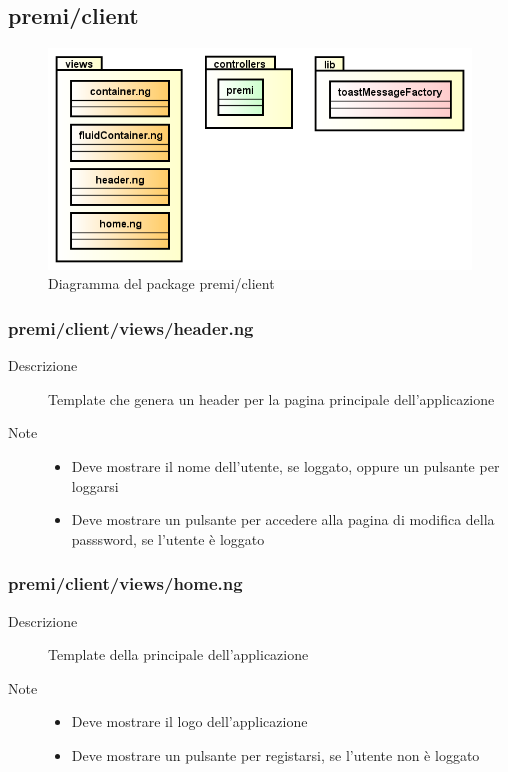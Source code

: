 \clearpage
\subsection{premi/client}
\begin{figure}[h]
\begin{center}
\includegraphics[scale=0.50]{img/diapkg/client.png}
\caption{Diagramma del package premi/client}
\end{center}
\end{figure}


\subsubsection{premi/client/views/header.ng}

\begin{description}
\item[Descrizione] \hfill
	Template che genera un header per la pagina principale dell'applicazione
	\item[Note] \hfill
	\begin{itemize}
			\item Deve mostrare il nome dell'utente, se loggato, oppure un pulsante per loggarsi
			\item Deve mostrare un pulsante per accedere alla pagina di modifica della passsword, se l'utente è loggato
	\end{itemize}
\end{description}

\subsubsection{premi/client/views/home.ng}

\begin{description}
\item[Descrizione] \hfill
	Template della principale dell'applicazione
	\item[Note] \hfill
	\begin{itemize}
			\item Deve mostrare il logo dell'applicazione
			\item Deve mostrare un pulsante per registarsi, se l'utente non è loggato
	\end{itemize}
\end{description}


